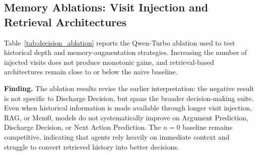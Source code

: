 \subsection{Memory Ablations: Visit Injection and Retrieval Architectures}



Table~\ref{tab:decision_ablation} reports the Qwen-Turbo ablation used to test historical depth and memory-augmentation strategies. Increasing the number of injected visits does not produce monotonic gains, and retrieval-based architectures remain close to or below the naive baseline.


\textbf{Finding.} The ablation results revise the earlier interpretation: the negative result is not specific to Discharge Decision, but spans the broader decision-making suite. Even when historical information is made available through longer visit injection, RAG, or Mem0, models do not systematically improve on Argument Prediction, Discharge Decision, or Next Action Prediction. The $n=0$ baseline remains competitive, indicating that agents rely heavily on immediate context and struggle to convert retrieved history into better decisions.

